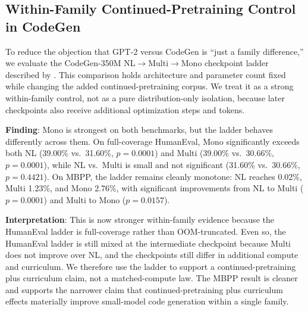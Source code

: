 \documentclass[preprint,12pt,authoryear]{elsarticle}
\begin{document}
\subsection{Within-Family Continued-Pretraining Control in CodeGen}

To reduce the objection that GPT-2 versus CodeGen is ``just a family difference,'' we evaluate the CodeGen-350M NL$\rightarrow$Multi$\rightarrow$Mono checkpoint ladder described by \citet{nijkamp2022codegen}. This comparison holds architecture and parameter count fixed while changing the added continued-pretraining corpus. We treat it as a strong within-family control, not as a pure distribution-only isolation, because later checkpoints also receive additional optimization steps and tokens.

\begin{table}[t]
\centering
\caption{CodeGen-350M Continued-Pretraining Ladder}
\label{tab:codegen_ladder}
\scriptsize
{}
\end{table}

\textbf{Finding}: Mono is strongest on both benchmarks, but the ladder behaves differently across them. On full-coverage HumanEval, Mono significantly exceeds both NL (39.00\% vs.\ 31.60\%, $p=0.0001$) and Multi (39.00\% vs.\ 30.66\%, $p=0.0001$), while NL vs.\ Multi is small and not significant (31.60\% vs.\ 30.66\%, $p=0.4421$). On MBPP, the ladder remains cleanly monotone: NL reaches 0.02\%, Multi 1.23\%, and Mono 2.76\%, with significant improvements from NL to Multi ($p=0.0001$) and Multi to Mono ($p=0.0157$).

\textbf{Interpretation}: This is now stronger within-family evidence because the HumanEval ladder is full-coverage rather than OOM-truncated. Even so, the HumanEval ladder is still mixed at the intermediate checkpoint because Multi does not improve over NL, and the checkpoints still differ in additional compute and curriculum. We therefore use the ladder to support a continued-pretraining plus curriculum claim, not a matched-compute law. The MBPP result is cleaner and supports the narrower claim that continued-pretraining plus curriculum effects materially improve small-model code generation within a single family.
\end{document}
